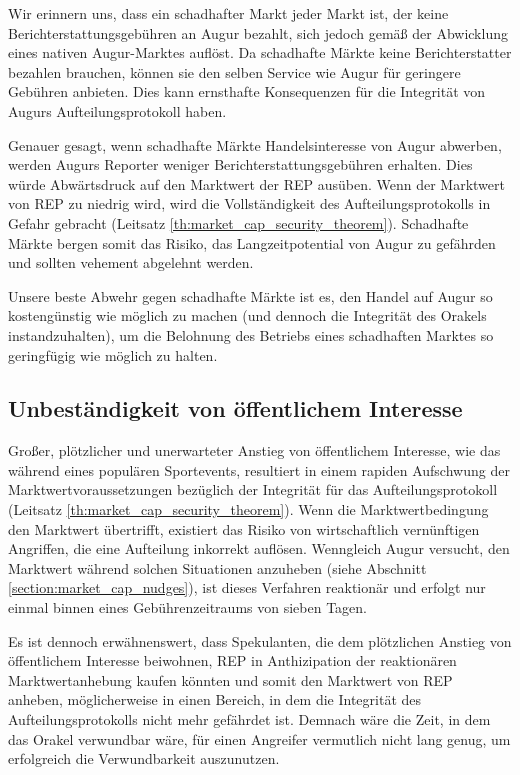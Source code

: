 \documentclass[floatfix,reprint,nofootinbib,amsmath,amssymb,epsfig,pre,floats,letterpaper,groupedaffiliation]{revtex4-1}
\theoremstyle{definition}
\theoremstyle{definition}
\theoremstyle{definition}
\begin{document}
Wir erinnern uns, dass ein schadhafter Markt jeder Markt ist, der keine Berichterstattungsgebühren an Augur bezahlt, sich jedoch gemäß der Abwicklung eines nativen Augur-Marktes auflöst. Da schadhafte Märkte keine Berichterstatter bezahlen brauchen, können sie den selben Service wie Augur für geringere Gebühren anbieten. Dies kann ernsthafte Konsequenzen für die Integrität von Augurs Aufteilungsprotokoll haben.

Genauer gesagt, wenn schadhafte Märkte Handelsinteresse von Augur abwerben, werden Augurs Reporter weniger Berichterstattungsgebühren erhalten. Dies würde Abwärtsdruck auf den Marktwert der REP ausüben. Wenn der Marktwert von REP zu niedrig wird, wird die Vollständigkeit des Aufteilungsprotokolls in Gefahr gebracht (Leitsatz \ref{th:market_cap_security_theorem}). Schadhafte Märkte bergen somit das Risiko, das Langzeitpotential von Augur zu gefährden und sollten vehement abgelehnt werden.

Unsere beste Abwehr gegen schadhafte Märkte ist es, den Handel auf Augur so kostengünstig wie möglich zu machen (und dennoch die Integrität des Orakels instandzuhalten), um die Belohnung des Betriebs eines schadhaften Marktes so geringfügig wie möglich zu halten.

\subsection{Unbeständigkeit von öffentlichem Interesse}

Großer, plötzlicher und unerwarteter Anstieg von öffentlichem Interesse, wie das während eines populären Sportevents, resultiert in einem rapiden Aufschwung der Marktwertvoraussetzungen bezüglich der Integrität für das Aufteilungsprotokoll (Leitsatz \ref{th:market_cap_security_theorem}). Wenn die Marktwertbedingung den Marktwert übertrifft, existiert das Risiko von wirtschaftlich vernünftigen Angriffen, die eine Aufteilung inkorrekt auflösen. Wenngleich Augur versucht, den Marktwert während solchen Situationen anzuheben (siehe Abschnitt \ref{section:market_cap_nudges}), ist dieses Verfahren reaktionär und erfolgt nur einmal binnen eines Gebührenzeitraums von sieben Tagen.

Es ist dennoch erwähnenswert, dass Spekulanten, die dem plötzlichen Anstieg von öffentlichem Interesse beiwohnen, REP in Anthizipation der reaktionären Marktwertanhebung kaufen könnten und somit den Marktwert von REP anheben, möglicherweise in einen Bereich, in dem die Integrität des Aufteilungsprotokolls nicht mehr gefährdet ist. Demnach wäre die Zeit, in dem das Orakel verwundbar wäre, für einen Angreifer vermutlich nicht lang genug, um erfolgreich die Verwundbarkeit auszunutzen.
\end{document}
